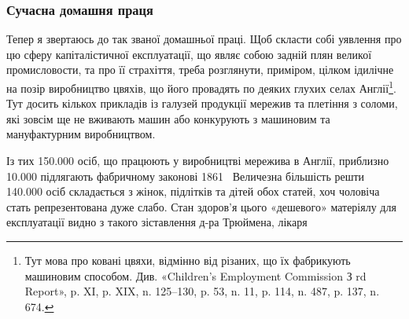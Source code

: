 
\subsubsection{Сучасна домашня праця}

Тепер я звертаюсь до так званої домашньої праці. Щоб скласти
собі уявлення про цю сферу капіталістичної експлуатації, що
являє собою задній плян великої промисловости, та про її страхіття,
треба розглянути, приміром, цілком ідилічне на позір виробництво
цвяхів, що його провадять по деяких глухих селах Англії\footnote{
Тут мова про ковані цвяхи, відмінно від різаних, що їх фабрикують
машиновим способом. Див. «Children’s Employment Commission
З rd Report», p. XI, p. XIX, n. 125--130, p. 53, n. 11, p. 114, n. 487,
p. 137, n. 674.
}.
Тут досить кількох прикладів із галузей продукції мережив та
плетіння з соломи, які зовсім ще не вживають машин або конкурують
з машиновим та мануфактурним виробництвом.

Із тих \num{150.000} осіб, що працюють у виробництві мережива в
Англії, приблизно \num{10.000} підлягають фабричному законові 1861~
Величезна більшість решти \num{140.000} осіб складається з жінок,
підлітків та дітей обох статей, хоч чоловіча стать репрезентована
дуже слабо. Стан здоров’я цього «дешевого» матеріялу для експлуатації
видно з такого зіставлення д-ра Трюймена, лікаря
\parbreak{}  %
